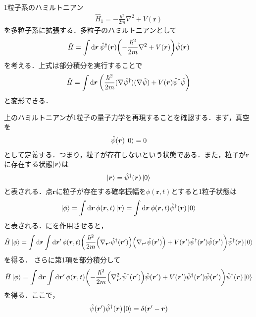 \documentclass{report}
\begin{document}
1粒子系のハミルトニアン
\begin{align}
  \hat{H}_1 = -\frac{\hbar^2}{2m}\nabla^2 + V(\bm{r})
\end{align}
を多粒子系に拡張する．多粒子のハミルトニアンとして
\begin{align}
  \hat{H} = \int \dd{\bm{r}} \hat{\psi}^{\dagger}(\bm{r}) \qty(-\frac{\hbar^2}{2m}\nabla^2 + V(\bm{r}))\hat{\psi}(\bm{r})
\end{align}
を考える．上式は部分積分を実行することで
\begin{align}
  \hat{H} = \int \dd{\bm{r}} \qty(\frac{\hbar^2}{2m}(\nabla\hat{\psi}^{\dagger})(\nabla\hat{\psi}) + V(\bm{r})\hat{\psi}^{\dagger}\hat{\psi}) \label{hamiltonian}
\end{align}
と変形できる．

上のハミルトニアンが1粒子の量子力学を再現することを確認する．まず，真空を
\begin{align}
  \hat{\psi}(\bm{r})\ket{0} = 0
\end{align}
として定義する．つまり，粒子が存在しないという状態である．また，粒子が$\bm{r}$に存在する状態$\ket{\bm{r}}$は
\begin{align}
  \ket{\bm{r}} = \hat{\psi}^{\dagger}(\bm{r}) \ket{0}
\end{align}
と表される．点$\bm{r}$に粒子が存在する確率振幅を$\phi(\bm{r},t)$とすると1粒子状態は
\begin{align}
  \ket{\phi} = \int \dd{\bm{r}} \phi(\bm{r},t) \ket{\bm{r}} = \int \dd{\bm{r}} \phi(\bm{r},t) \hat{\psi}^{\dagger}(\bm{r})\ket{0} \label{1-state}
\end{align}
と表される．にを作用させると，
\begin{align}
  \hat{H}\ket{\phi} = \int \dd{\bm{r}} \int \dd{\bm{r}'} \phi(\bm{r},t) \qty(\frac{\hbar^2}{2m}\qty(\nabla_{\bm{r}'}\hat{\psi}^{\dagger}(\bm{r}'))\qty(\nabla_{\bm{r}'}\hat{\psi}(\bm{r}')) + V(\bm{r}')\hat{\psi}^{\dagger}(\bm{r}')\hat{\psi}(\bm{r}'))\hat{\psi}^{\dagger}(\bm{r})\ket{0}
\end{align}
を得る．
さらに第1項を部分積分して
\begin{align}
  \hat{H}\ket{\phi} = \int \dd{\bm{r}} \int \dd{\bm{r}'} \phi(\bm{r},t) \qty(-\frac{\hbar^2}{2m}\qty(\nabla_{\bm{r}'}^2\hat{\psi}^{\dagger}(\bm{r}'))\hat{\psi}(\bm{r}') + V(\bm{r}')\hat{\psi}^{\dagger}(\bm{r}')\hat{\psi}(\bm{r}'))\hat{\psi}^{\dagger}(\bm{r})\ket{0}
\end{align}
を得る．ここで，
\begin{align}
  \hat{\psi}(\bm{r}')\hat{\psi}^{\dagger}(\bm{r}) \ket{0} = \delta(\bm{r}' - \bm{r})
\end{align}
\end{document}
